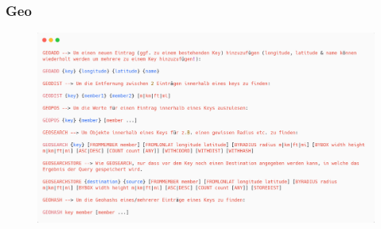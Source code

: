 \subsubsection{Geo}
\begin{figure}[H]
    \centering
    \includegraphics[width=\textwidth]{res/themenkorb_8/redis_geo.png}
\end{figure}